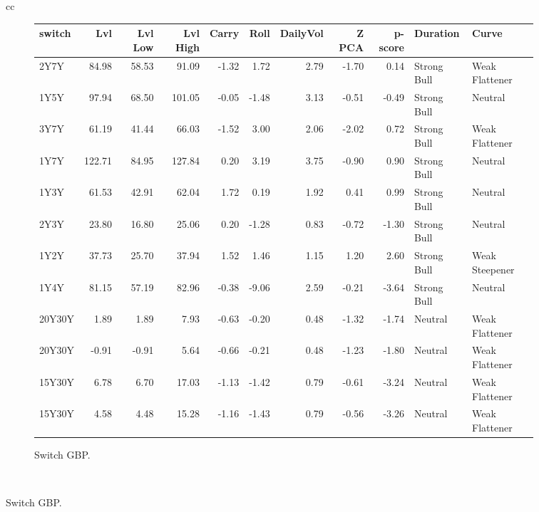 \documentclass[a4paper,twoside]{report}
\begin{document}
\begin{figure}[htbp]
\begin{tabular}[c]{cc}
\begin{subfigure}[c]{0.5\textwidth}
\caption{Switch GBP.}
\label{fig:Switch GBP}
\begin{adjustbox}{max width=\textwidth}
\begin{tabular}{lrrrrrrrrll}
\hline
 switch &     Lvl &  Lvl Low &  Lvl High &  Carry &  Roll &  DailyVol &  Z PCA &  p-score &     Duration &           Curve \\
\hline
   2Y7Y &   84.98 &    58.53 &     91.09 &  -1.32 &  1.72 &      2.79 &  -1.70 &     0.14 &  Strong Bull &  Weak Flattener \\
   1Y5Y &   97.94 &    68.50 &    101.05 &  -0.05 & -1.48 &      3.13 &  -0.51 &    -0.49 &  Strong Bull &         Neutral \\
   3Y7Y &   61.19 &    41.44 &     66.03 &  -1.52 &  3.00 &      2.06 &  -2.02 &     0.72 &  Strong Bull &  Weak Flattener \\
   1Y7Y &  122.71 &    84.95 &    127.84 &   0.20 &  3.19 &      3.75 &  -0.90 &     0.90 &  Strong Bull &         Neutral \\
   1Y3Y &   61.53 &    42.91 &     62.04 &   1.72 &  0.19 &      1.92 &   0.41 &     0.99 &  Strong Bull &         Neutral \\
   2Y3Y &   23.80 &    16.80 &     25.06 &   0.20 & -1.28 &      0.83 &  -0.72 &    -1.30 &  Strong Bull &         Neutral \\
   1Y2Y &   37.73 &    25.70 &     37.94 &   1.52 &  1.46 &      1.15 &   1.20 &     2.60 &  Strong Bull &  Weak Steepener \\
   1Y4Y &   81.15 &    57.19 &     82.96 &  -0.38 & -9.06 &      2.59 &  -0.21 &    -3.64 &  Strong Bull &         Neutral \\
 20Y30Y &    1.89 &     1.89 &      7.93 &  -0.63 & -0.20 &      0.48 &  -1.32 &    -1.74 &      Neutral &  Weak Flattener \\
 20Y30Y &   -0.91 &    -0.91 &      5.64 &  -0.66 & -0.21 &      0.48 &  -1.23 &    -1.80 &      Neutral &  Weak Flattener \\
 15Y30Y &    6.78 &     6.70 &     17.03 &  -1.13 & -1.42 &      0.79 &  -0.61 &    -3.24 &      Neutral &  Weak Flattener \\
 15Y30Y &    4.58 &     4.48 &     15.28 &  -1.16 & -1.43 &      0.79 &  -0.56 &    -3.26 &      Neutral &  Weak Flattener \\
\hline
\end{tabular}
\end{adjustbox}
 \end{subfigure}\\
 

\end{tabular}
\end{figure}
\end{document}
